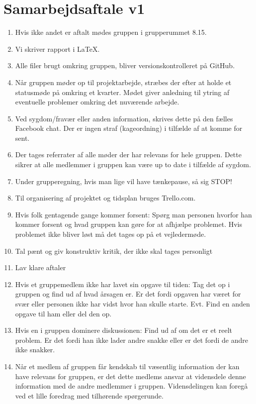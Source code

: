 \documentclass{article}
\begin{document}
	\section*{Samarbejdsaftale v1}

	\begin{enumerate}
		\item Hvis ikke andet er aftalt mødes gruppen i grupperummet 8.15.

		\item Vi skriver rapport i LaTeX.

		\item Alle filer brugt omkring gruppen, bliver versionskontrolleret på GitHub.

		\item Når gruppen møder op til projektarbejde, stræbes der efter at holde et statusmøde på omkring et kvarter. Mødet giver anledning til ytring af eventuelle problemer omkring det nuværende arbejde.

		\item Ved sygdom/fravær eller anden information, skrives dette på den fælles Facebook chat. Der er ingen straf (kageordning) i tilfælde af at komme for sent.

		\item Der tages referrater af alle møder der har relevans for hele gruppen. Dette
    	sikrer at alle medlemmer i gruppen kan være up to date i tilfælde af sygdom.

    	\item Under grupperegning, hvis man lige vil have tænkepause, så sig STOP!

    	\item Til organisering af projektet og tidsplan bruges Trello.com.

    	\item Hvis folk gentagende gange kommer forsent: Spørg man personen hvorfor han kommer forsent og hvad gruppen kan gøre for at afhjælpe problemet. Hvis problemet ikke bliver løst må det tages op på et vejledermøde. 

    	\item Tal pænt og giv konstruktiv kritik, der ikke skal tages personligt

    	\item Lav klare aftaler

    	\item Hvis et gruppemedlem ikke har lavet sin opgave til tiden: Tag det op i gruppen og find ud af hvad årsagen er. Er det fordi opgaven har været for svær eller personen ikke har vidst hvor han skulle starte. Evt. Find en anden opgave til ham eller del den op.

    	\item Hvis en i gruppen dominere diskussionen: Find ud af om det er et reelt problem. Er det fordi han ikke lader andre snakke eller er det fordi de andre ikke snakker. 

      \item Når et medlem af gruppen får kendskab til væsentlig information der kan have relevans for gruppen, er det dette medlems ansvar at vidensdele denne information med de andre medlemmer i gruppen. Vidensdelingen kan foregå ved et lille foredrag med tilhørende spørgerunde.
	\end{enumerate}
\end{document}
